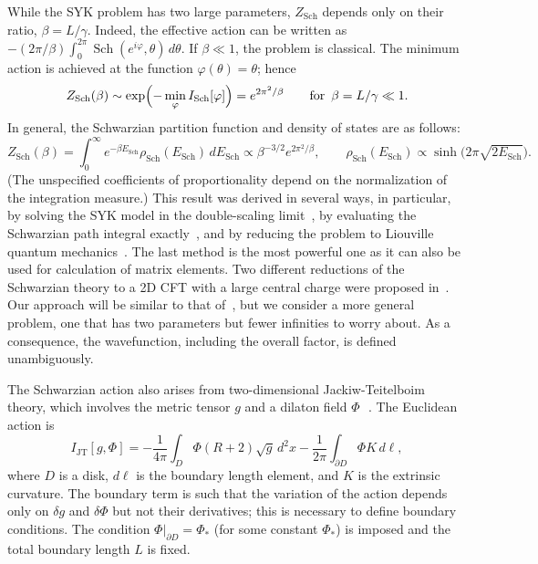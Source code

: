 \documentclass[12pt]{article}
\newcommand{\vp}{\varphi}
\DeclareMathOperator{\Sch}{Sch}
\begin{document}
While the SYK problem has two large parameters, $Z_{\Sch}$ depends only on their ratio, $\beta=L/\gamma$. Indeed, the effective action can be written as $-(2\pi/\beta)\int_{0}^{2\pi}\Sch(e^{i\vp},\theta)\,d\theta$. If $\beta\ll 1$, the problem is classical. The minimum action is achieved at the function $\vp(\theta)=\theta$; hence
\begin{equation}
Z_{\Sch}(\beta) \sim \exp\Bigl(-\min_{\vp} I_{\Sch}[\vp]\Bigr)
=e^{2\pi^2/\beta}\qquad \text{for }\, \beta=L/\gamma\ll 1.
\end{equation}
In general, the Schwarzian partition function and density of states are as follows:
\begin{equation}\label{ZSch}
Z_{\Sch}(\beta) =\int_{0}^{\infty}e^{-\beta E_{\Sch}}\rho_{\Sch}(E_{\Sch})\,dE_{\Sch}
\propto \beta^{-3/2} e^{2\pi^2/\beta},\qquad
\rho_{\Sch}(E_{\Sch}) \propto\sinh\biggl(2\pi\sqrt{2E_{\Sch}}\biggr).
\end{equation}
(The unspecified coefficients of proportionality depend on the normalization of the integration measure.) This result was derived in several ways, in particular, by solving the SYK model in the double-scaling limit~\cite{randmat}, by evaluating the Schwarzian path integral exactly~\cite{StWi17}, and by reducing the problem to Liouville quantum mechanics~\cite{BaAlKa16,BaAlKa17}. The last method is the most powerful one as it can also be used for calculation of matrix elements. Two different reductions of the Schwarzian theory to a 2D CFT with a large central charge were proposed in~\cite{MeTuVe17}. Our approach will be similar to that of~\cite{BaAlKa16,BaAlKa17}, but we consider a more general problem, one that has two parameters but fewer infinities to worry about. As a consequence, the wavefunction, including the overall factor, is defined unambiguously. 

The Schwarzian action also arises from two-dimensional Jackiw-Teitelboim theory, which involves the metric tensor $g$ and a dilaton field $\Phi$\,~\cite{Jen16,MSY16,EMV16}. The Euclidean action is
\begin{equation}\label{IJT}
I_{\text{JT}}[g,\Phi]
=-\frac{1}{4\pi}\int_{D}\Phi(R+2)\sqrt{g}\,d^2x
-\frac{1}{2\pi}\int_{\partial D}\Phi K\,d\ell,
\end{equation}
where $D$ is a disk, $d\ell$ is the boundary length element, and $K$ is the extrinsic curvature. The boundary term is such that the variation of the action depends only on $\delta g$ and $\delta\Phi$ but not their derivatives; this is necessary to define boundary conditions. The condition $\Phi|_{\partial D}=\Phi_*$ (for some constant $\Phi_*$) is imposed and the total boundary length $L$ is fixed.
\end{document}
